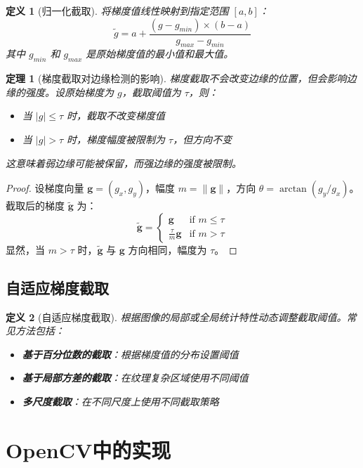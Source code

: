 \documentclass{article}
\newtheorem{definition}{定义}[section]
\newtheorem{theorem}{定理}[section]
\begin{document}
\begin{definition}[归一化截取]
将梯度值线性映射到指定范围 $[a, b]$：
\[
\tilde{g} = a + \frac{(g - g_{min}) \times (b - a)}{g_{max} - g_{min}}
\]
其中 $g_{min}$ 和 $g_{max}$ 是原始梯度值的最小值和最大值。
\end{definition}

\begin{theorem}[梯度截取对边缘检测的影响]
梯度截取不会改变边缘的位置，但会影响边缘的强度。设原始梯度为 $g$，截取阈值为 $\tau$，则：
\begin{itemize}
    \item 当 $|g| \leq \tau$ 时，截取不改变梯度值
    \item 当 $|g| > \tau$ 时，梯度幅度被限制为 $\tau$，但方向不变
\end{itemize}
这意味着弱边缘可能被保留，而强边缘的强度被限制。
\end{theorem}

\begin{proof}
设梯度向量 $\mathbf{g} = (g_x, g_y)$，幅度 $m = \|\mathbf{g}\|$，方向 $\theta = \arctan(g_y/g_x)$。截取后的梯度 $\tilde{\mathbf{g}}$ 为：
\[
\tilde{\mathbf{g}} = \begin{cases}
\mathbf{g} & \text{if } m \leq \tau \\
\frac{\tau}{m} \mathbf{g} & \text{if } m > \tau
\end{cases}
\]
显然，当 $m > \tau$ 时，$\tilde{\mathbf{g}}$ 与 $\mathbf{g}$ 方向相同，幅度为 $\tau$。
\end{proof}

\subsection{自适应梯度截取}

\begin{definition}[自适应梯度截取]
根据图像的局部或全局统计特性动态调整截取阈值。常见方法包括：
\begin{itemize}
    \item \textbf{基于百分位数的截取}：根据梯度值的分布设置阈值
    \item \textbf{基于局部方差的截取}：在纹理复杂区域使用不同阈值
    \item \textbf{多尺度截取}：在不同尺度上使用不同截取策略
\end{itemize}
\end{definition}

\section{OpenCV中的实现}
\end{document}
